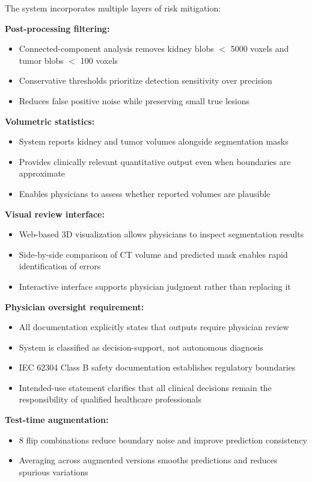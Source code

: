 The system incorporates multiple layers of risk mitigation:

\textbf{Post-processing filtering:}
\begin{itemize}
    \item Connected-component analysis removes kidney blobs $<$ 5000 voxels and tumor blobs $<$ 100 voxels
    \item Conservative thresholds prioritize detection sensitivity over precision
    \item Reduces false positive noise while preserving small true lesions
\end{itemize}

\textbf{Volumetric statistics:}
\begin{itemize}
    \item System reports kidney and tumor volumes alongside segmentation masks
    \item Provides clinically relevant quantitative output even when boundaries are approximate
    \item Enables physicians to assess whether reported volumes are plausible
\end{itemize}

\textbf{Visual review interface:}
\begin{itemize}
    \item Web-based 3D visualization allows physicians to inspect segmentation results
    \item Side-by-side comparison of CT volume and predicted mask enables rapid identification of errors
    \item Interactive interface supports physician judgment rather than replacing it
\end{itemize}

\textbf{Physician oversight requirement:}
\begin{itemize}
    \item All documentation explicitly states that outputs require physician review
    \item System is classified as decision-support, not autonomous diagnosis
    \item IEC 62304 Class B safety documentation establishes regulatory boundaries
    \item Intended-use statement clarifies that all clinical decisions remain the responsibility of qualified healthcare professionals
\end{itemize}

\textbf{Test-time augmentation:}
\begin{itemize}
    \item 8 flip combinations reduce boundary noise and improve prediction consistency
    \item Averaging across augmented versions smooths predictions and reduces spurious variations
\end{itemize}

